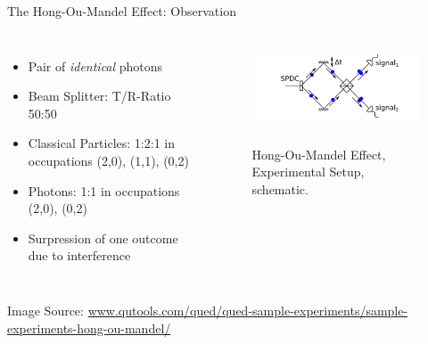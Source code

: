\begin{frame}{The Hong-Ou-Mandel Effect: Observation}
%
\begin{columns}[t]
\begin{itemize}
\item Pair of \emph{identical} photons %
\item Beam Splitter: T/R-Ratio 50:50
\item Classical Particles: 1:2:1 in occupations (2,0), (1,1), (0,2)
\item Photons: 1:1 in occupations (2,0), (0,2)
\item[\Thus] Surpression of one outcome due to interference
\end{itemize}
%
\begin{figure}
	\includegraphics[height=2.5cm]{./gfx/HOM-simple}\hspace{200pt}	
	\begin{flushleft}
		\footnotesize Hong-Ou-Mandel Effect, Experimental Setup, schematic.
	\end{flushleft}
\end{figure}
\end{columns}

\vspace{30pt}
{\scriptsize 
	Image Source: \url{www.qutools.com/qued/qued-sample-experiments/sample-experiments-hong-ou-mandel/}
}
%
\end{frame}


